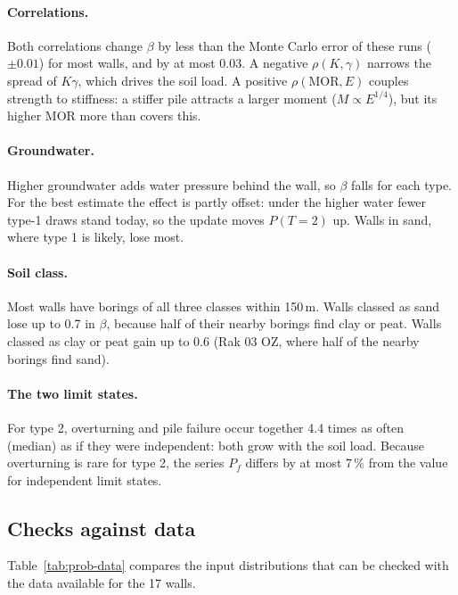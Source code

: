 \paragraph{Correlations.} Both correlations change $\beta$ by less than the
Monte Carlo error of these runs ($\pm 0.01$) for most walls, and by at most
0.03. A negative $\rho(K,\gamma)$ narrows the spread of $K\gamma$, which drives
the soil load. A positive $\rho(\text{MOR},E)$ couples strength to stiffness:
a stiffer pile attracts a larger moment ($M \propto E^{1/4}$), but its higher
MOR more than covers this.

\paragraph{Groundwater.} Higher groundwater adds water pressure behind the
wall, so $\beta$ falls for each type. For the best estimate the effect is
partly offset: under the higher water fewer type-1 draws stand today, so the
update moves $P(T{=}2)$ up. Walls in sand, where type 1 is likely, lose most.

\paragraph{Soil class.} Most walls have borings of all three classes within
150\,m. Walls classed as sand lose up to 0.7 in $\beta$, because half of their
nearby borings find clay or peat. Walls classed as clay or peat gain up to
0.6 (Rak 03 OZ, where half of the nearby borings find sand).

\paragraph{The two limit states.} For type 2, overturning and pile failure
occur together 4.4 times as often (median) as if they were independent: both
grow with the soil load. Because overturning is rare for type 2, the series
$P_f$ differs by at most 7\,\% from the value for independent limit states.

\subsection{Checks against data}\label{app:prob-data}

Table~\ref{tab:prob-data} compares the input distributions that can be
checked with the data available for the 17 walls.

